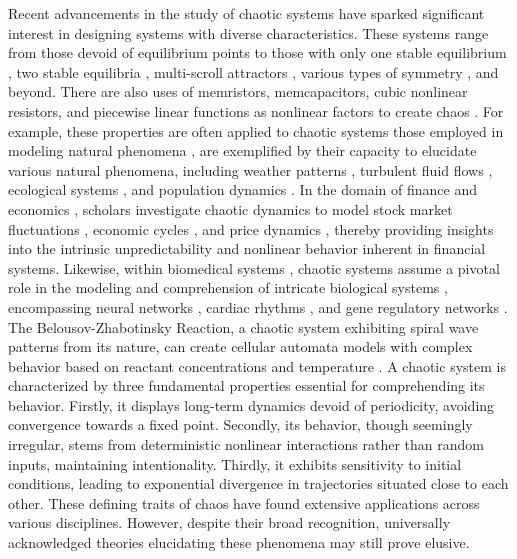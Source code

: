 \documentclass[11pt]{article}
\theoremstyle{definition}
\begin{document}
Recent advancements in the study of chaotic systems have sparked significant interest in designing systems with diverse characteristics. These systems range from those devoid of equilibrium points \cite{ren2018new,wang2019sbox} to those with only one stable equilibrium \cite{wang2012chaotic}, two stable equilibria \cite{wang2017chaotic}, multi-scroll attractors \cite{rajagopal2019multiscroll,pehlivan2019multiscroll}, various types of symmetry \cite{field2009symmetry}, and beyond. There are also uses of memristors, memcapacitors, cubic nonlinear resistors, and piecewise linear functions as nonlinear factors to create chaos \cite{wei2018synchronisation,varan2018control,rajagopal2019dynamical,akgul2019chaotic,rajagopal2019simple}. For example, these properties are often applied to chaotic systems those employed in modeling natural phenomena \cite{sanabria_modelling_2020}, are exemplified by their capacity to elucidate various natural phenomena, including weather patterns \cite{noauthor_weather_nodate}, turbulent fluid flows \cite{noauthor_turbulent_nodate}, ecological systems \cite{crawford_ecological_2020}, and population dynamics \cite{noauthor_population_nodate}. In the domain of finance and economics \cite{liao_study_2020}, scholars investigate chaotic dynamics to model stock market fluctuations \cite{vogl_chaos_2024}, economic cycles \cite{tusset_dynamic_2023}, and price dynamics \cite{ait_omar_chaotic_2022}, thereby providing insights into the intrinsic unpredictability and nonlinear behavior inherent in financial systems. Likewise, within biomedical systems \cite{grigorenko_study_2022}, chaotic systems assume a pivotal role in the modeling and comprehension of intricate biological systems \cite{li_incorporating_2023}, encompassing neural networks \cite{lin_chaotic_2020}, cardiac rhythms \cite{cheffer_biochaos_2022}, and gene regulatory networks \cite{uthamacumaran_review_2021}. The Belousov-Zhabotinsky Reaction, a chaotic system exhibiting spiral wave patterns from its nature, can create cellular automata models with complex behavior based on reactant concentrations and temperature \cite{karimov_empirically_2023,luengviriya_meandering_2013,chopard_cellular_2022}. A chaotic system is characterized by three fundamental properties essential for comprehending its behavior. Firstly, it displays long-term dynamics devoid of periodicity, avoiding convergence towards a fixed point. Secondly, its behavior, though seemingly irregular, stems from deterministic nonlinear interactions rather than random inputs, maintaining intentionality. Thirdly, it exhibits sensitivity to initial conditions, leading to exponential divergence in trajectories situated close to each other. These defining traits of chaos have found extensive applications across various disciplines. However, despite their broad recognition, universally acknowledged theories elucidating these phenomena may still prove elusive.
\end{document}
